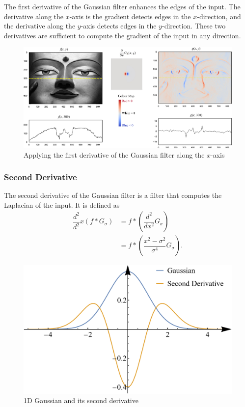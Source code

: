 The first derivative of the Gaussian filter enhances the edges of the input. The derivative along the $x$-axis is the gradient detects edges in the $x$-direction, and the derivative along the $y$-axis detects edges in the $y$-direction. These two derivatives are sufficient to compute the gradient of the input in any direction.

\begin{figure}[ht!]
    \centering
    \includegraphics[width=\linewidth]{figures/1st-order-gaussian-derivative.jpg}

    \caption{Applying the first derivative of the Gaussian filter along the $x$-axis}
\end{figure}
\vspace{-1em}
\subsubsection{Second Derivative}

The second derivative of the Gaussian filter is a filter that computes the Laplacian of the input. It is defined as 
\begin{align*}
    \dfrac{d^2}{d^2}x \left( f \ast G_\sigma \right) & = f \ast \left( \dfrac{d^2}{dx^2} G_\sigma \right)                 \\
                                                     & = f \ast \left( \dfrac{x^2 - \sigma^2}{\sigma^4} G_\sigma \right).
\end{align*}
\vspace{-1em}
\begin{figure}[ht!]
    \centering
    \includegraphics[width=0.5\linewidth]{figures/1d-gaussian-2nd-derivative.png}
    \caption{1D Gaussian and its second derivative}
\end{figure}

